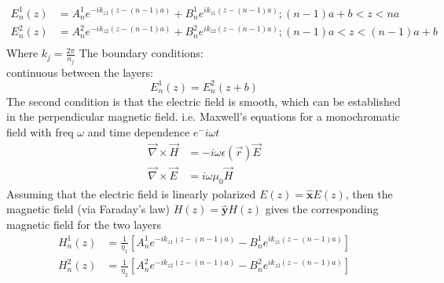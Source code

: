\begin{equation}
	\begin{aligned}
		E^1_n(z) &= A^1_n e^{-ik_{z1}(z-(n-1)a)} + B^1_n e^{ik_{z1}(z-(n-1)a)};  (n-1)a+b<z<na\\
		E^2_n(z) &= A^2_n e^{-ik_{z2}(z-(n-1)a)} + B^2_n e^{ik_{z2}(z-(n-1)a)};  (n-1)a<z<(n-1)a+b\\
	\end{aligned}
\end{equation}
Where $k _j= \frac{2\pi}{n_j}$
The boundary conditions:\\
continuous between the layers:
\begin{equation}
	E^1_n(z) = E^2_n(z+b)
\end{equation}
The second condition is that the electric field is smooth, which can be established in the perpendicular magnetic field. 
i.e. Maxwell's equations for a monochromatic field with freq $\omega$ and time dependence $e^-i\omega t$
\begin{equation}
	\begin{aligned}
		\vec{\nabla}\times\vec{H} &= -i\omega\epsilon(\vec{r})\vec{E}\\
		\vec{\nabla}\times\vec{E} &= i\omega\mu_0\vec{H}	
	\end{aligned}
	\label{eqn:maxwell}
\end{equation}
Assuming that the electric field is linearly polarized $E(z) = \boldsymbol{\hat{x}}E(z)$, then the magnetic field (via Faraday's law) $H(z) = \boldsymbol{\hat{y}}H(z)$ gives the corresponding magnetic field for the two layers 
\begin{equation}
	\begin{aligned}
		H^1_n(z) &=\frac{1}{\eta_1}[A^1_n e^{-ik_{z1}(z-(n-1)a)} - B^1_n e^{ik_{z1}(z-(n-1)a)}]\\
		H^2_n(z) &= \frac{1}{\eta_2}[A^2_n e^{-ik_{z2}(z-(n-1)a)} - B^2_n e^{ik_{z2}(z-(n-1)a)}]
	\end{aligned}
\end{equation}


